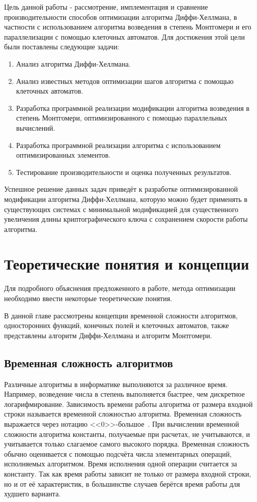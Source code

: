 \documentclass[times,specification,annotation]{itmo-student-thesis}
\begin{document}
Цель данной работы - рассмотрение, имплементация и сравнение производительности способов оптимизации алгоритма
Диффи-Хеллмана, в частности с использованием алгоритма возведения в степень Монтгомери и его параллелизации
с помощью клеточных автоматов.
Для достижения этой цели были поставлены следующие задачи:
\begin{enumerate}[label=\arabic*.]
    \item Анализ алгоритма Диффи-Хеллмана.
    \item Анализ известных методов оптимизации шагов алгоритма с помощью клеточных автоматов.
    \item Разработка программной реализации модификации алгоритма возведения в степень Монтгомери, оптимизированного с помощью параллельных вычислений.
    \item Разработка программной реализации алгоритма с использованием оптимизированных элементов.
    \item Тестирование производительности и оценка полученных результатов.
\end{enumerate}
Успешное решение данных задач приведёт к разработке оптимизированной модификации алгоритма Диффи-Хеллмана,
которую можно будет применять в существующих системах с минимальной модификацией для существенного увеличения длины
криптографического ключа с сохранением скорости работы алгоритма.


\chapter{Теоретические понятия и концепции}

\startrelatedwork
Для подробного объяснения предложенного в работе, метода оптимизации необходимо ввести некоторые теоретические понятия.

В данной главе рассмотрены концепции временной сложности алгоритмов, односторонних функций, конечных полей и клеточных автоматов,
также представлены алгоритм Диффи-Хеллмана и алгоритм Монтгомери.

\section{Временная сложность алгоритмов}\label{sec:asympt}

Различные алгоритмы в информатике выполняются за различное время.
Например, возведение числа в степень выполняется быстрее, чем дискретное логарифмирование.
Зависимость времени работы алгоритма от размера входной строки называется временной сложностью алгоритма.
Временная сложность выражается через нотацию <<$\textit{0}$>>-большое~\cite{knu97}.
При вычислении временной сложности алгоритма константы, получаемые при расчетах, не учитываются, и учитывается только слагаемое самого высокого порядка.
Временная сложность обычно оценивается с помощью подсчёта числа элементарных операций, исполняемых алгоритмом.
Время исполнения одной операции считается за константу.
Так как время работы зависит не только от размера входной строки, но и от её характеристик,
в большинстве случаев берётся время работы для худшего варианта.
\end{document}
